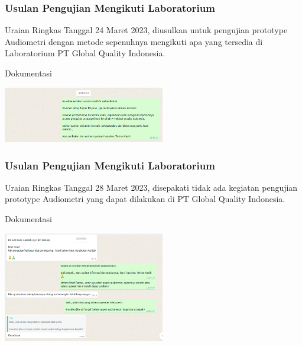 \documentclass[table,dvipsnames]{beamer}
\begin{document}
	\begin{frame}
		\frametitle{Usulan Pengujian Mengikuti Laboratorium}

		\begin{exampleblock}{Uraian Ringkas}
			Tanggal 24 Maret 2023, diusulkan untuk pengujian prototype Audiometri dengan metode sepenuhnya mengikuti apa yang tersedia
			di Laboratorium PT Global Quality Indonesia.
		\end{exampleblock}

		\begin{exampleblock}{Dokumentasi}
			\begin{center}
				\includegraphics[width=200pt]{images/doc5}
			\end{center}
		\end{exampleblock}
	\end{frame}

	\begin{frame}
		\frametitle{Usulan Pengujian Mengikuti Laboratorium}

		\begin{exampleblock}{Uraian Ringkas}
			Tanggal 28 Maret 2023, disepakati tidak ada kegiatan pengujian prototype Audiometri yang dapat dilakukan di PT Global Quality Indonesia.
		\end{exampleblock}

		\begin{exampleblock}{Dokumentasi}
			\begin{center}
				\includegraphics[width=200pt]{images/doc6}
			\end{center}
		\end{exampleblock}
	\end{frame}
\end{document}
